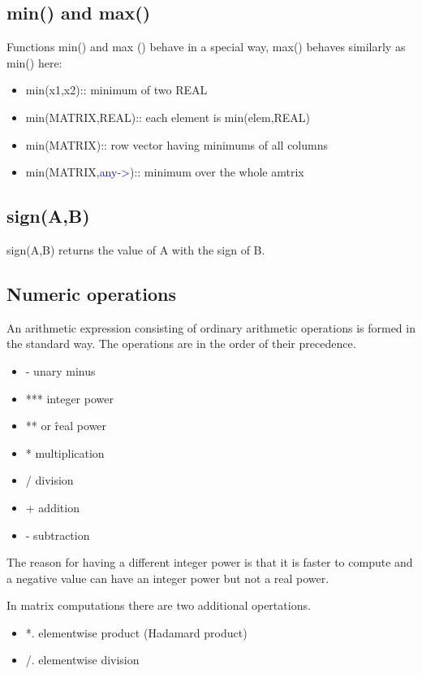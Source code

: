 \subsection{\textcolor{VioletRed}{min}() and \textcolor{VioletRed}{max}()}
\label{minmax}
Functions \textcolor{VioletRed}{min}() and max ()
behave in a special way, \textcolor{VioletRed}{max}() behaves similarly as \textcolor{VioletRed}{min}() here:
\begin{itemize}
\item \textcolor{VioletRed}{min}(x1,x2):: minimum of two REAL
\item \textcolor{VioletRed}{min}(MATRIX,REAL):: each element is \textcolor{VioletRed}{min}(elem,REAL)
\item \textcolor{VioletRed}{min}(MATRIX):: row vector having minimums of all columns
\item \textcolor{VioletRed}{min}(MATRIX,\textcolor{blue}{any->}):: minimum over the whole amtrix
\end{itemize}
\subsection{\textcolor{VioletRed}{sign}(A,B)}
\label{sign}
\textcolor{VioletRed}{sign}(A,B) returns the value of A with the sign of B.
\subsection{Numeric operations}
\label{numer}
An arithmetic expression consisting of ordinary arithmetic operations is formed in
the standard way. The operations are in the order of their precedence.
\begin{itemize}
\item - unary minus
\item *** integer power
\item ** or \^ real power
\item * multiplication
\item / division
\item + addition
\item - subtraction
\end{itemize}

The reason for having a different integer power is that it is faster to compute and a negative
value can have an integer power but not a real power.

In matrix computations there are two additional opertations.

\begin{itemize}
\item *. elementwise product (Hadamard product)
\item /. elementwise division
\end{itemize}

